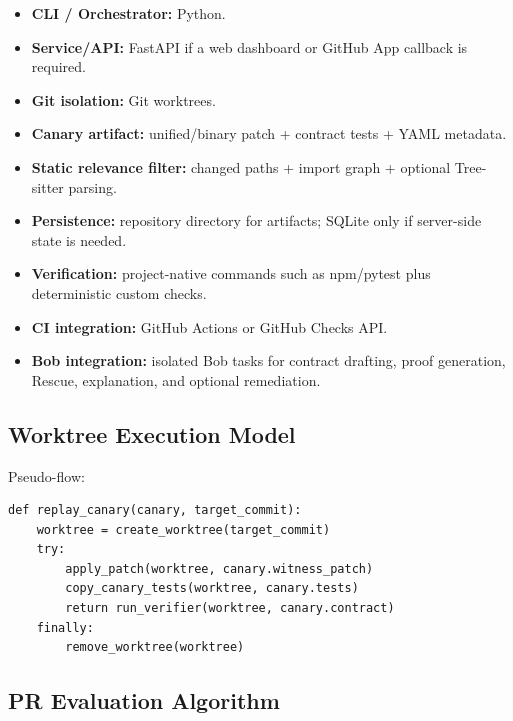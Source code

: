 \documentclass[12pt]{article}
\begin{document}
\begin{itemize}
    \item \textbf{CLI / Orchestrator:} Python.
    \item \textbf{Service/API:} FastAPI if a web dashboard or GitHub App callback is required.
    \item \textbf{Git isolation:} Git worktrees.
    \item \textbf{Canary artifact:} unified/binary patch + contract tests + YAML metadata.
    \item \textbf{Static relevance filter:} changed paths + import graph + optional Tree-sitter parsing.
    \item \textbf{Persistence:} repository directory for artifacts; SQLite only if server-side state is needed.
    \item \textbf{Verification:} project-native commands such as npm/pytest plus deterministic custom checks.
    \item \textbf{CI integration:} GitHub Actions or GitHub Checks API.
    \item \textbf{Bob integration:} isolated Bob tasks for contract drafting, proof generation, Rescue, explanation, and optional remediation.
\end{itemize}

\subsection{Worktree Execution Model}

Pseudo-flow:

\begin{lstlisting}
def replay_canary(canary, target_commit):
    worktree = create_worktree(target_commit)
    try:
        apply_patch(worktree, canary.witness_patch)
        copy_canary_tests(worktree, canary.tests)
        return run_verifier(worktree, canary.contract)
    finally:
        remove_worktree(worktree)
\end{lstlisting}

\subsection{PR Evaluation Algorithm}
\end{document}
